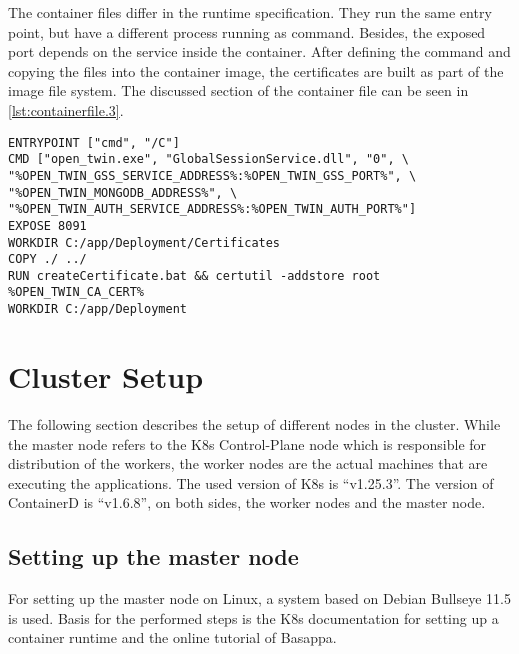 The container files differ in the runtime specification. They run the same entry point, but have a different process running as command. Besides, the exposed port depends on the service inside the container. 
After defining the command and copying the files into the container image, the certificates are built as part of the image file system. The discussed section of the container file can be seen in \autoref{lst:containerfile.3}.
\begin{lstlisting}[label=lst:containerfile.3, caption={Containerfile for the \ac{GSS}. Description of the command line and certificate creation. (\textit{Distribution/Container/globalsession.Containerfile})}, language=docker, firstnumber=21]
ENTRYPOINT ["cmd", "/C"]
CMD ["open_twin.exe", "GlobalSessionService.dll", "0", \
"%OPEN_TWIN_GSS_SERVICE_ADDRESS%:%OPEN_TWIN_GSS_PORT%", \
"%OPEN_TWIN_MONGODB_ADDRESS%", \
"%OPEN_TWIN_AUTH_SERVICE_ADDRESS%:%OPEN_TWIN_AUTH_PORT%"]
EXPOSE 8091
WORKDIR C:/app/Deployment/Certificates
COPY ./ ../
RUN createCertificate.bat && certutil -addstore root %OPEN_TWIN_CA_CERT%
WORKDIR C:/app/Deployment
\end{lstlisting}



\section{Cluster Setup}
The following section describes the setup of different nodes in the cluster. While the master node refers to the \ac{K8s} Control-Plane node which is responsible for distribution of the workers, the worker nodes are the actual machines that are executing the applications.
The used version of \ac{K8s} is \enquote{v1.25.3}. The version of ContainerD is \enquote{v1.6.8}, on both sides, the worker nodes and the master node.

\subsection{Setting up the master node}
For setting up the master node on Linux, a system based on Debian Bullseye 11.5 is used. Basis for the performed steps is the \ac{K8s} documentation for setting up a container runtime\cite{Kubernetes.2019} and the online tutorial of Basappa\cite{Basappa.2022}.


